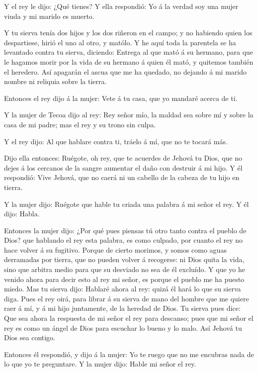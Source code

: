  Y el rey le dijo: ¿Qué tienes? Y ella respondió: Yo á la
verdad soy una mujer viuda y mi marido es muerto.

 Y tu sierva tenía dos hijos y los dos riñeron en el campo;
y no habiendo quien los despartiese, hirió el uno al otro, y matólo.
 Y he aquí toda la parentela se ha levantado contra tu
sierva, diciendo: Entrega al que mató á su hermano, para que le hagamos
morir por la vida de su hermano á quien él mató, y quitemos también el
heredero. Así apagarán el ascua que me ha quedado, no dejando á mi
marido nombre ni reliquia sobre la tierra.

 Entonces el rey dijo á la mujer: Vete á tu casa, que yo
mandaré acerca de ti.

 Y la mujer de Tecoa dijo al rey: Rey señor mío, la maldad
sea sobre mí y sobre la casa de mi padre; mas el rey y su trono sin
culpa.

 Y el rey dijo: Al que hablare contra ti, tráelo á mí, que
no te tocará más.

 Dijo ella entonces: Ruégote, oh rey, que te acuerdes de
Jehová tu Dios, que no dejes á los cercanos de la sangre aumentar el
daño con destruir á mi hijo. Y él respondió: Vive Jehová, que no caerá
ni un cabello de la cabeza de tu hijo en tierra.

 Y la mujer dijo: Ruégote que hable tu criada una palabra á
mi señor el rey. Y él dijo: Habla.

 Entonces la mujer dijo: ¿Por qué pues piensas tú otro
tanto contra el pueblo de Dios? que hablando el rey esta palabra, es
como culpado, por cuanto el rey no hace volver á su fugitivo.
 Porque de cierto morimos, y somos como aguas derramadas
por tierra, que no pueden volver á recogerse: ni Dios quita la vida,
sino que arbitra medio para que su desviado no sea de él excluído.
 Y que yo he venido ahora para decir esto al rey mi señor,
es porque el pueblo me ha puesto miedo. Mas tu sierva dijo: Hablaré
ahora al rey: quizá él hará lo que su sierva diga.  Pues el
rey oirá, para librar á su sierva de mano del hombre que me quiere raer
á mí, y á mi hijo juntamente, de la heredad de Dios.  Tu
sierva pues dice: Que sea ahora la respuesta de mi señor el rey para
descanso; pues que mi señor el rey es como un ángel de Dios para
escuchar lo bueno y lo malo. Así Jehová tu Dios sea contigo.

 Entonces él respondió, y dijo á la mujer: Yo te ruego que
no me encubras nada de lo que yo te preguntare. Y la mujer dijo: Hable
mi señor el rey.

